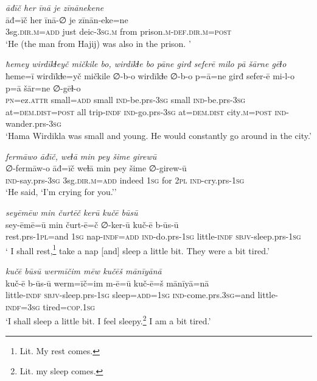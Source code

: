 \ea \label{BP.140}
\textit{āđīč her īnā je zīnānekene} \\ 
\gll āđ=īč her īnā-∅ je zīnān-eke=ne \\ 
 3sg\textsc{.dir}\textsc{.m}\textsc{=add} just deic\textsc{-3sg}\textsc{.m} from prison\textsc{.m}\textsc{-def}\textsc{.dir}\textsc{.m}\textsc{=\textsc{post}} \\ 
\glt `He (the man from Hajij) was also in the prison. '
\z 
 
\ea \label{BP.143}
\textit{ħemey wirdīkɫeyč mičkile bo, wirdīkɫe bo pāne girđ seferē milo pā šārne gēɫo} \\ 
\gll ħeme=ī wirdīkɫe=yč mičkile ∅-b-o wirdīkɫe ∅-b-o p=ā=ne girđ sefer-ē mi-l-o p=ā šār=ne ∅-gēɫ-o \\ 
 \textsc{pn}=ez.\textsc{attr} small\textsc{=add} small \textsc{ind-}be.prs\textsc{-3sg} small \textsc{ind-}be.prs\textsc{-3sg} at=\textsc{dem.dist}\textsc{=\textsc{post}} all trip\textsc{-indf} \textsc{ind-}go.prs\textsc{-3sg} at=\textsc{dem.dist} city\textsc{.m}\textsc{=\textsc{post}} \textsc{ind-}wander.prs\textsc{-3sg} \\ 
\glt `Hama Wirdikla was small and young. He would constantly go around in the city.'
\z 
 
\ea \label{BP.155}
\textit{fermāwo āđīč, weɫā min pey šime girewū} \\ 
\gll ∅-fermāw-o āđ=īč weɫā min pey šime ∅-girew-ū \\ 
 \textsc{ind-}say.prs\textsc{-3sg} 3sg\textsc{.dir}\textsc{.m}\textsc{=add} indeed \textsc{1sg} for \textsc{2pl} \textsc{ind-}cry.prs\textsc{-\textsc{1sg}} \\ 
\glt `He said, ‘I’m crying for you.’'
\z 
 
\ea \label{BP.182}
\textit{seyēmēw min čurtēč kerū kučē būsū} \\ 
\gll sey-ēmē=ū min čurt-ē=č ∅-ker-ū kuč-ē b-ūs-ū \\ 
 rest.prs-\textsc{1pl}=and \textsc{1sg} nap\textsc{-indf}\textsc{=add} \textsc{ind-}do.prs\textsc{-\textsc{1sg}} little\textsc{-indf} \textsc{sbjv-}sleep.prs\textsc{-\textsc{1sg}} \\ 
\glt ` I shall rest,\footnote{Lit. My rest comes.} take a nap [and] sleep a little bit. They were a bit tired.'
\z 
 
\ea \label{BP.183}
\textit{kučē būsū wermīčim mēw kučēš mānīyānā} \\ 
\gll kuč-ē b-ūs-ū werm=īč=im m-ē=ū kuč-ē=š mānīyā=nā \\ 
 little\textsc{-indf} \textsc{sbjv-}sleep.prs\textsc{-\textsc{1sg}} sleep\textsc{=add}\textsc{=\textsc{1sg}} \textsc{ind-}come.prs\textsc{.3sg}=and little\textsc{-indf}\textsc{=3sg} tired\textsc{=cop}\textsc{.\textsc{1sg}} \\ 
\glt `I shall sleep a little bit. I feel sleepy.\footnote{Lit. my sleep comes.} I am a bit tired.'
\z 
 
